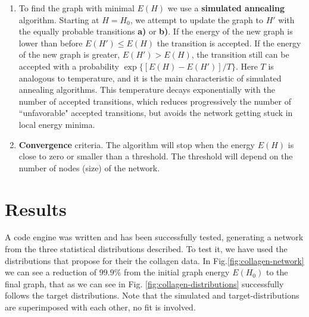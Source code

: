 \begin{enumerate}[label=\textbf{\Roman*}]
  \item To find the graph with minimal $E(H)$ we use a \textbf{simulated
  annealing} algorithm. Starting at $H=H_0$, we attempt to update the graph to
  $H'$ with the equally probable transitions \textbf{a)} or \textbf{b)}.  If the
  energy of the new graph is lower than before $E(H')\leq E(H)$ the transition
  is accepted. If the energy of the new graph is greater, $E(H')> E(H)$, the
  transition still can be accepted with a probability $\exp\{[E(H)-E(H')]/T\}$.
  Here $T$ is  analogous to temperature, and it is the main characteristic of
  simulated annealing algorithms. This temperature decays exponentially with the number of accepted transitions, which reduces
  progressively the number of ``unfavorable" accepted transitions, but avoids
  the network getting stuck in local energy minima.
  \item \textbf{Convergence} criteria. The algorithm will stop when the energy
  $E(H)$ is close to zero or smaller than a threshold.
  The threshold will depend on the number of nodes (size) of the network.
\end{enumerate}

\section{Results}
A code engine was written and has been successfully tested,
generating a network from the three statistical distributions described.
To test it, we have used the distributions that
\citet{lindstrom_biopolymer_2010} propose for their
the collagen data. In Fig.\ref{fig:collagen-network} we
can see a reduction of $99.9\%$ from the initial graph energy $E(H_0)$ to the
final graph, that as we can see in Fig.
\ref{fig:collagen-distributions} successfully follows the target distributions.
Note that the simulated and target-distributions are superimposed with each other, no fit is involved.

